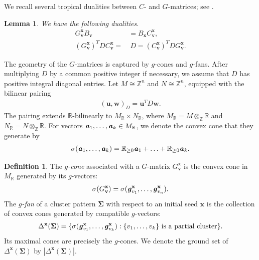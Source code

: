 \documentclass[11pt,reqno]{amsart}
\theoremstyle{plain}
\newtheorem{lemma}[theorem]{Lemma}
\theoremstyle{definition}
\newtheorem{definition}[theorem]{Definition}
\numberwithin{equation}{section}
\newcommand\ZZ{\mathbb{Z}}
\newcommand\RR{\mathbb{R}}
\newcommand\<{\langle}
\renewcommand\>{\rangle}
\def\ww{\mathbf{w}}
\def\vv{\mathbf{v}}
\def\uu{\mathbf{u}}
\def\con{\sigma}
\def\fan{\Delta}
\newcommand{\bfit}[1]{\textbf{\textit{#1}}}
\def\seeds{\mathbf{\Sigma}}
\def\xx{\mathbf{x}}%
\newcommand{\pos}[1]{[#1]_+}
\def\gvec{\bfit{g}}
\def\Cmat{{C}}
\def\Gmat{{G}}
\begin{document}
We recall several tropical dualities between $C$- and $G$-matrices; see \cite{FZ,NZ}.

\begin{lemma}
We have the following dualities.
\begin{align}
    \label{eq:dual1}
    \Gmat^{\xx}_\vv B_{\vv}&= B_{\xx} \Cmat^{\xx}_\vv,\\
    \label{eq:dual2}
    (\Gmat^{\xx}_\vv)^T D \Cmat^{\xx}_\vv=&~D=(\Cmat^{\xx}_\vv)^T D \Gmat^{\xx}_\vv.
\end{align}
\end{lemma}


The geometry of the $G$-matrices is captured by $g$-cones and $g$-fans.
After multiplying $D$ by a common positive integer if necessary, we assume that $D$ has positive integral diagonal entries. 
Let $M\cong\ZZ^n$ and $N\cong\ZZ^n$, equipped with the bilinear pairing
\begin{gather}\label{eq:pairing}
    (\uu,\ww)_D=\uu^T D \ww.
\end{gather}
The pairing extends $\RR$-bilinearly to $M_\RR\times N_\RR$, where $M_\RR=M\otimes_\ZZ\RR$ and $N_\RR=N\otimes_\ZZ\RR$.
For vectors $\bfit{a}_1,\ldots,\bfit{a}_k\in M_\RR$, we denote the convex cone that they generate by
\[
    \con(\bfit{a}_1,\ldots,\bfit{a}_k)=\RR_{\ge0} \bfit{a}_1 + \ldots + \RR_{\ge0} \bfit{a}_k.
\]
\begin{definition}
The \emph{$g$-cone} associated with a $G$-matrix $\Gmat^\xx_\vv$ is the convex cone in $M_\RR$ generated by its $g$-vectors:
\begin{gather}\label{eq:gcone}
    \con(\Gmat^\xx_\vv)=\con(\gvec^\xx_{v_1},\ldots,\gvec^\xx_{v_n}).
\end{gather}
The \emph{$g$-fan} of a cluster pattern $\seeds$ with respect to an initial seed $\xx$ is the collection of convex cones generated by compatible $g$-vectors:
\begin{gather}\label{eq:gfan}
    \fan^\xx(\seeds)=\{\con(\gvec^\xx_{v_1},\ldots,\gvec^\xx_{v_k}):\{v_1,\ldots,v_k\}\text{ is a partial cluster}\}.
\end{gather}
Its maximal cones are precisely the $g$-cones. We denote the ground set of $\fan^\xx(\seeds)$ by $|\fan^\xx(\seeds)|$.
\end{definition}
\end{document}
